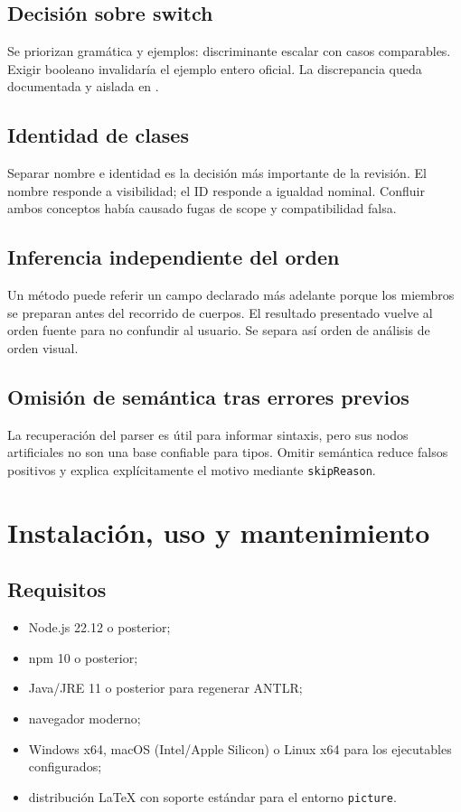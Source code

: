 \documentclass[11pt,letterpaper,oneside]{report}
\newcommand{\archivo}[1]{\path{#1}}
\newcommand{\codigo}[1]{\texttt{#1}}
\begin{document}
\section{Decisión sobre switch}

Se priorizan gramática y ejemplos: discriminante escalar con casos comparables. Exigir
booleano invalidaría el ejemplo entero oficial. La discrepancia queda documentada y
aislada en \archivo{DECISIONES\_SEMANTICAS.md}.

\section{Identidad de clases}

Separar nombre e identidad es la decisión más importante de la revisión. El nombre
responde a visibilidad; el ID responde a igualdad nominal. Confluir ambos conceptos
había causado fugas de scope y compatibilidad falsa.

\section{Inferencia independiente del orden}

Un método puede referir un campo declarado más adelante porque los miembros se
preparan antes del recorrido de cuerpos. El resultado presentado vuelve al orden
fuente para no confundir al usuario. Se separa así orden de análisis de orden visual.

\section{Omisión de semántica tras errores previos}

La recuperación del parser es útil para informar sintaxis, pero sus nodos artificiales
no son una base confiable para tipos. Omitir semántica reduce falsos positivos y
explica explícitamente el motivo mediante \codigo{skipReason}.

\chapter{Instalación, uso y mantenimiento}

\section{Requisitos}

\begin{itemize}
  \item Node.js 22.12 o posterior;
  \item npm 10 o posterior;
  \item Java/JRE 11 o posterior para regenerar ANTLR;
  \item navegador moderno;
  \item Windows x64, macOS (Intel/Apple Silicon) o Linux x64 para los ejecutables configurados;
  \item distribución LaTeX con soporte estándar para el entorno \codigo{picture}.
\end{itemize}
\end{document}

